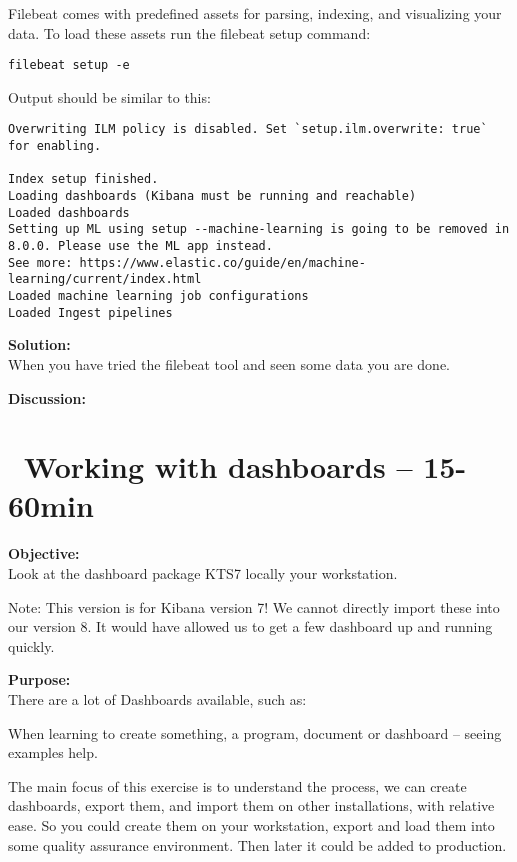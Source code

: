 \documentclass[a4paper,11pt,notitlepage]{report}
\begin{document}

Filebeat comes with predefined assets for parsing, indexing, and visualizing your data. To load these assets run the filebeat setup command:

\begin{verbatim}
filebeat setup -e
\end{verbatim}

Output should be similar to this:
\begin{verbatim}
Overwriting ILM policy is disabled. Set `setup.ilm.overwrite: true` for enabling.

Index setup finished.
Loading dashboards (Kibana must be running and reachable)
Loaded dashboards
Setting up ML using setup --machine-learning is going to be removed in 8.0.0. Please use the ML app instead.
See more: https://www.elastic.co/guide/en/machine-learning/current/index.html
Loaded machine learning job configurations
Loaded Ingest pipelines
\end{verbatim}


{\bf Solution:}\\
When you have tried the filebeat tool and seen some data you are done.

{\bf Discussion:}\\



\chapter{\faExclamationTriangle\ Working with dashboards -- 15-60min}
\label{ex:kibana-kts}

{\bf Objective:}\\

Look at the dashboard package KTS7 locally your workstation.

Note: This version is for Kibana version 7! We cannot directly import these into our version 8. It would have allowed us to get a few dashboard up and running quickly.


{\bf Purpose:}\\
There are a lot of Dashboards available, such as:\\

When learning to create something, a program, document or dashboard -- seeing examples help.

The main focus of this exercise is to understand the process, we can create dashboards, export them, and import them on other installations, with relative ease. So you could create them on your workstation, export and load them into some quality assurance environment. Then later it could be added to production.
\end{document}
